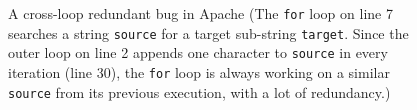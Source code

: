 



\begin{figure}
  \centering
  \mbox{}
  \caption{A cross-loop redundant bug in Apache 
{\footnotesize{(The \texttt{for} loop on line 7 
searches a string \texttt{source} for a target sub-string 
\texttt{target}. Since the outer loop on line 2 appends one 
character to \texttt{source} in every iteration (line 30), 
the \texttt{for} loop is always working on a similar 
\texttt{source} from its previous execution, with a lot of redundancy.}}) 
}
  \label{fig:Apache34464}
\end{figure}

